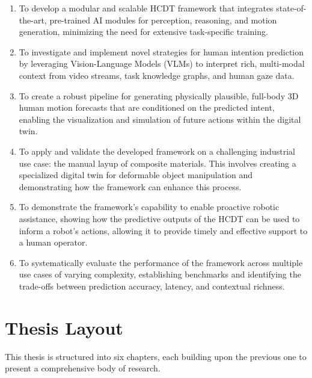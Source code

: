 \begin{enumerate}
    \item To develop a modular and scalable HCDT framework that integrates state-of-the-art, pre-trained AI modules for perception, reasoning, and motion generation, minimizing the need for extensive task-specific training.

    \item To investigate and implement novel strategies for human intention prediction by leveraging Vision-Language Models (VLMs) to interpret rich, multi-modal context from video streams, task knowledge graphs, and human gaze data.

    \item To create a robust pipeline for generating physically plausible, full-body 3D human motion forecasts that are conditioned on the predicted intent, enabling the visualization and simulation of future actions within the digital twin.

    \item To apply and validate the developed framework on a challenging industrial use case: the manual layup of composite materials. This involves creating a specialized digital twin for deformable object manipulation and demonstrating how the framework can enhance this process.

    \item To demonstrate the framework's capability to enable proactive robotic assistance, showing how the predictive outputs of the HCDT can be used to inform a robot's actions, allowing it to provide timely and effective support to a human operator.

    \item To systematically evaluate the performance of the framework across multiple use cases of varying complexity, establishing benchmarks and identifying the trade-offs between prediction accuracy, latency, and contextual richness.
\end{enumerate}

\section{Thesis Layout}
\label{sec:layout}

This thesis is structured into six chapters, each building upon the previous one to present a comprehensive body of research.


